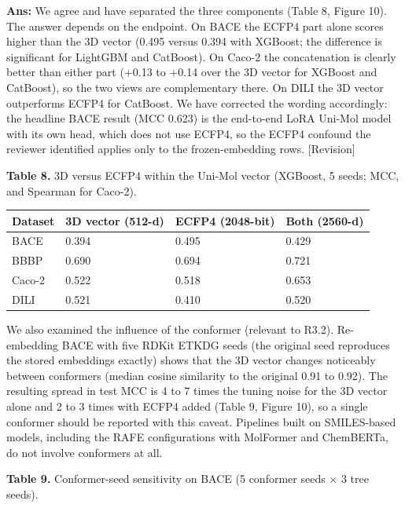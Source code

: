 \documentclass[
  10pt,
]{article}
\begin{document}
\textbf{Ans:} We agree and have separated the three components (Table 8,
Figure 10). The answer depends on the endpoint. On BACE the ECFP4 part
alone scores higher than the 3D vector (0.495 versus 0.394 with XGBoost;
the difference is significant for LightGBM and CatBoost). On Caco-2 the
concatenation is clearly better than either part (+0.13 to +0.14 over
the 3D vector for XGBoost and CatBoost), so the two views are
complementary there. On DILI the 3D vector outperforms ECFP4 for
CatBoost. We have corrected the wording accordingly: the headline BACE
result (MCC 0.623) is the end-to-end LoRA Uni-Mol model with its own
head, which does not use ECFP4, so the ECFP4 confound the reviewer
identified applies only to the frozen-embedding rows. {[}Revision{]}

\textbf{Table 8.} 3D versus ECFP4 within the Uni-Mol vector (XGBoost, 5
seeds; MCC, and Spearman for Caco-2).

\begin{longtable}[]{@{}llll@{}}
\toprule
Dataset & 3D vector (512-d) & ECFP4 (2048-bit) & Both
(2560-d)\tabularnewline
\midrule
\endhead
BACE & 0.394 & 0.495 & 0.429\tabularnewline
BBBP & 0.690 & 0.694 & 0.721\tabularnewline
Caco-2 & 0.522 & 0.518 & 0.653\tabularnewline
DILI & 0.521 & 0.410 & 0.520\tabularnewline
\bottomrule
\end{longtable}

We also examined the influence of the conformer (relevant to R3.2).
Re-embedding BACE with five RDKit ETKDG seeds (the original seed
reproduces the stored embeddings exactly) shows that the 3D vector
changes noticeably between conformers (median cosine similarity to the
original 0.91 to 0.92). The resulting spread in test MCC is 4 to 7 times
the tuning noise for the 3D vector alone and 2 to 3 times with ECFP4
added (Table 9, Figure 10), so a single conformer should be reported
with this caveat. Pipelines built on SMILES-based models, including the
RAFE configurations with MolFormer and ChemBERTa, do not involve
conformers at all.

\textbf{Table 9.} Conformer-seed sensitivity on BACE (5 conformer seeds
× 3 tree seeds).
\end{document}
